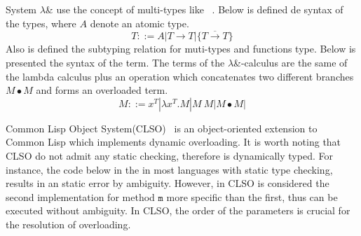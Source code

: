 \documentclass[hidelinks, twocolumn]{article}
\begin{document}
System $\lambda$\& use the concept of multi-types like ~\cite{BETTINI2009261, FJM}. Below is defined de syntax of the types, where $A$ denote an atomic type.
\[T ::= A| T \to T|\{\overline{T \to T}\}\]
Also is defined the subtyping relation for muti-types and functions type. 	
Below is presented the syntax of the term. The terms of the  $\lambda$\&-calculus are the same of the lambda calculus plus an operation which concatenates two different branches $ M \bullet M$ and forms an overloaded term. 
\[M ::= x^T| \lambda x^T. M| M \ M| M \bullet M|\]



\medskip 



Common Lisp Object System(CLSO)~\cite{Bobrow:1988:CLO:885631.885632} is an object-oriented extension to Common Lisp which implements dynamic overloading. It is worth noting that CLSO do not admit any static checking, therefore is dynamically typed. For instance, the code below in the in most languages with static type checking, results in an static error by ambiguity. However, in CLSO is considered the second implementation for  method $\texttt{m}$ more specific than the first, thus can be executed without ambiguity. In CLSO, the order of the parameters is crucial for the resolution of overloading.\\


\end{document}
